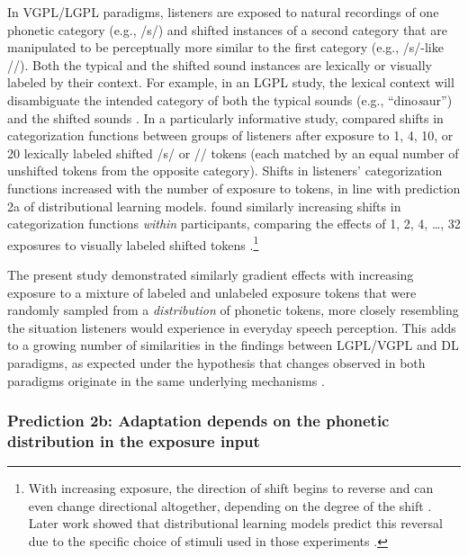 \documentclass[
  11pt,
  man,mask,floatsintext]{apa6}
\begin{document}
In VGPL/LGPL paradigms, listeners are exposed to natural recordings of one phonetic category (e.g., /s/) and shifted instances of a second category that are manipulated to be perceptually more similar to the first category (e.g., /s/-like //). Both the typical and the shifted sound instances are lexically or visually labeled by their context. For example, in an LGPL study, the lexical context will disambiguate the intended category of both the typical sounds (e.g., ``dino\emph{s}aur'') and the shifted sounds \autocites[e.g., ``medi\emph{sh}ine'',][]{norris2003,eisner-mcqueen2005,kraljic-samuel2005}.
In a particularly informative study, \textcite{cummings-theodore2023} compared shifts in categorization functions between groups of listeners after exposure to 1, 4, 10, or 20 lexically labeled shifted /s/ or // tokens (each matched by an equal number of unshifted tokens from the opposite category). Shifts in listeners' categorization functions increased with the number of exposure to tokens, in line with prediction 2a of distributional learning models. \textcite{vroomen2007} found similarly increasing shifts in categorization functions \emph{within} participants, comparing the effects of 1, 2, 4, \ldots, 32 exposures to visually labeled shifted tokens \autocite[see also][]{kleinschmidt-jaeger2012}.\footnote{With increasing exposure, the direction of shift begins to reverse \autocites[returning to baseline after 128-256 exposures,][]{kleinschmidt-jaeger2011,vroomen2007} and can even change directional altogether, depending on the degree of the shift \autocite{kleinschmidt-jaeger2012}. Later work showed that distributional learning models predict this reversal due to the specific choice of stimuli used in those experiments \autocite{kleinschmidt-jaeger2015}.}

The present study demonstrated similarly gradient effects with increasing exposure to a mixture of labeled and unlabeled exposure tokens that were randomly sampled from a \emph{distribution} of phonetic tokens, more closely resembling the situation listeners would experience in everyday speech perception. This adds to a growing number of similarities in the findings between LGPL/VGPL and DL paradigms, as expected under the hypothesis that changes observed in both paradigms originate in the same underlying mechanisms \autocites[see discussions in][]{kleinschmidt2015,zheng-samuel2020,xie2023}.

\subsubsection{Prediction 2b: Adaptation depends on the phonetic distribution in the exposure input}\label{prediction-2b-adaptation-depends-on-the-phonetic-distribution-in-the-exposure-input}
\end{document}
